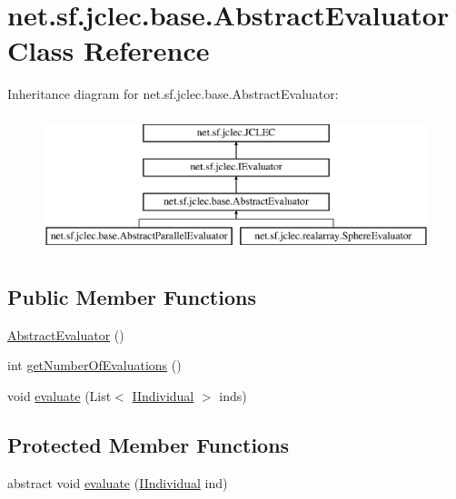 \hypertarget{classnet_1_1sf_1_1jclec_1_1base_1_1_abstract_evaluator}{\section{net.\-sf.\-jclec.\-base.\-Abstract\-Evaluator Class Reference}
\label{classnet_1_1sf_1_1jclec_1_1base_1_1_abstract_evaluator}
}
Inheritance diagram for net.\-sf.\-jclec.\-base.\-Abstract\-Evaluator\-:\begin{figure}[H]
\begin{center}
\leavevmode
\includegraphics[height=4.000000cm]{classnet_1_1sf_1_1jclec_1_1base_1_1_abstract_evaluator}
\end{center}
\end{figure}
\subsection*{Public Member Functions}
\begin{DoxyCompactItemize}
\item 
\hyperlink{classnet_1_1sf_1_1jclec_1_1base_1_1_abstract_evaluator_a3f8105ac25e482fec118d58aa6bd9db6}{Abstract\-Evaluator} ()
\item 
int \hyperlink{classnet_1_1sf_1_1jclec_1_1base_1_1_abstract_evaluator_a4bf8163d0769193b1d92327d29cf3247}{get\-Number\-Of\-Evaluations} ()
\item 
void \hyperlink{classnet_1_1sf_1_1jclec_1_1base_1_1_abstract_evaluator_a33398832b681b02d99b739c51fef4acb}{evaluate} (List$<$ \hyperlink{interfacenet_1_1sf_1_1jclec_1_1_i_individual}{I\-Individual} $>$ inds)
\end{DoxyCompactItemize}
\subsection*{Protected Member Functions}
\begin{DoxyCompactItemize}
\item 
abstract void \hyperlink{classnet_1_1sf_1_1jclec_1_1base_1_1_abstract_evaluator_ab268ad679c75a9612d262cc957976471}{evaluate} (\hyperlink{interfacenet_1_1sf_1_1jclec_1_1_i_individual}{I\-Individual} ind)
\end{DoxyCompactItemize}


